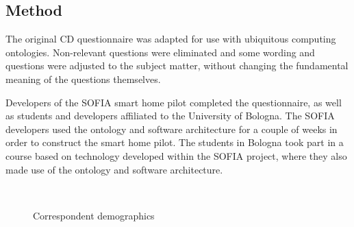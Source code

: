 \subsection{Method}

The original \ac{CD} questionnaire \cite{Blackwell2007} was adapted for use with ubiquitous computing ontologies. Non-relevant questions were eliminated and some wording and questions were adjusted to the subject matter, without changing the fundamental meaning of the questions themselves. 

Developers of the \ac{SOFIA} smart home pilot completed the questionnaire, as well as students and developers affiliated to the University of Bologna. The \ac{SOFIA} developers used the ontology and software architecture for a couple of weeks in order to construct the smart home pilot. The students in Bologna took part in a course based on technology developed within the \ac{SOFIA} project, where they also made use of the ontology and software architecture. 

\begin{figure}[bth] 
         \quad
         \\
         \quad
        
        \caption{Correspondent demographics}\label{demographics}
\end{figure}

% 
% 
% 

